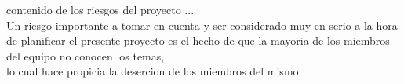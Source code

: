 \documentclass{article}
\begin{document}
	contenido de los riesgos del proyecto ...\\
	Un riesgo importante  a tomar en cuenta y ser considerado muy en serio a la hora de planificar el presente proyecto es el hecho de que la mayoria de los miembros del equipo no conocen los temas, \\
	lo cual hace propicia la desercion de los miembros del mismo 
\end{document}
